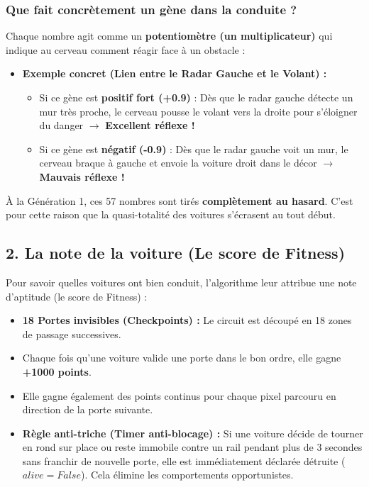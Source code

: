 \documentclass[12pt,a4paper]{article}
\begin{document}
\subsubsection{Que fait concrètement un gène dans la conduite ?}
Chaque nombre agit comme un \textbf{potentiomètre (un multiplicateur)} qui indique au cerveau comment réagir face à un obstacle :
\begin{itemize}[leftmargin=*]
  \item \textbf{Exemple concret (Lien entre le Radar Gauche et le Volant) :}
  \begin{itemize}
    \item Si ce gène est \textbf{positif fort (+0.9)} : Dès que le radar gauche détecte un mur très proche, le cerveau pousse le volant vers la droite pour s'éloigner du danger $\to$ \textbf{Excellent réflexe !}
    \item Si ce gène est \textbf{négatif (-0.9)} : Dès que le radar gauche voit un mur, le cerveau braque à gauche et envoie la voiture droit dans le décor $\to$ \textbf{Mauvais réflexe !}
  \end{itemize}
\end{itemize}
À la Génération 1, ces 57 nombres sont tirés \textbf{complètement au hasard}. C'est pour cette raison que la quasi-totalité des voitures s'écrasent au tout début.

\subsection{2. La note de la voiture (Le score de Fitness)}
Pour savoir quelles voitures ont bien conduit, l'algorithme leur attribue une note d'aptitude (le score de Fitness) :
\begin{itemize}[leftmargin=*]
  \item \textbf{18 Portes invisibles (Checkpoints) :} Le circuit est découpé en 18 zones de passage successives.
  \item Chaque fois qu'une voiture valide une porte dans le bon ordre, elle gagne \textbf{+1000 points}.
  \item Elle gagne également des points continus pour chaque pixel parcouru en direction de la porte suivante.
  \item \textbf{Règle anti-triche (Timer anti-blocage) :} Si une voiture décide de tourner en rond sur place ou reste immobile contre un rail pendant plus de 3 secondes sans franchir de nouvelle porte, elle est immédiatement déclarée détruite ($alive = False$). Cela élimine les comportements opportunistes.
\end{itemize}
\end{document}
